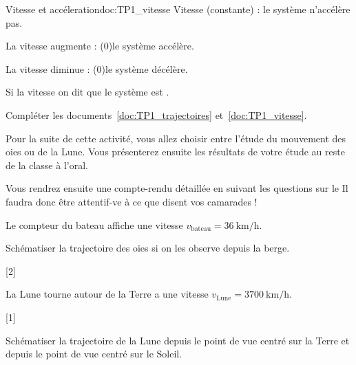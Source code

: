 \begin{doc}{Vitesse et accéleration}{doc:TP1_vitesse}
  Vitesse  (constante) : le système n’accélère pas.
  
  La vitesse augmente : \texteTrou(0){le système accélère.}
  
  La vitesse diminue : \texteTrou(0){le système décélère.}
  
  Si la vitesse  on dit que le système est .
\end{doc}


\numeroQuestion
Compléter les documents~\ref{doc:TP1_trajectoires} et~\ref{doc:TP1_vitesse}.

\fleche Pour la suite de cette activité, vous allez choisir entre l'étude du mouvement des oies ou de la Lune.
Vous présenterez ensuite les résultats de votre étude au reste de la classe à l'oral.

\fleche Vous rendrez ensuite une compte-rendu détaillée en suivant les questions sur le 
Il faudra donc être attentif-ve à ce que disent vos camarades !


\pasCorrection{ \newpage \vspace*{-40pt} }

Le compteur du bateau affiche une vitesse $v_\text{bateau} = \qty{36}{\km/\hour}$.


\mesure Schématiser la trajectoire des oies si on les observe depuis la berge.
\vspace*{120pt}

[2]



La Lune tourne autour de la Terre a une vitesse $v_\text{Lune} = \qty{3700}{\km/\hour}$.


[1]

\mesure Schématiser la trajectoire de la Lune depuis le point de vue centré sur la Terre et  depuis le point de vue centré sur le Soleil.
\vspace*{120pt}


